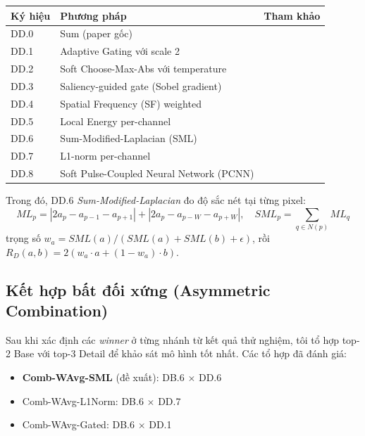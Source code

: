 \documentclass[12pt,a4paper]{article}
\begin{document}
\begin{table}[h]
\centering
\small
\begin{tabular}{lll}
\toprule
\textbf{Ký hiệu} & \textbf{Phương pháp} & \textbf{Tham khảo} \\
\midrule
DD.0 & Sum (paper gốc) & \cite{zhao2023cddfuse} \\
DD.1 & Adaptive Gating với scale 2 & \cite{prabhakar2017deepfuse} \\
DD.2 & Soft Choose-Max-Abs với temperature & \cite{li1995wavelet} \\
DD.3 & Saliency-guided gate (Sobel gradient) & \cite{liu2016saliency} \\
DD.4 & Spatial Frequency (SF) weighted & \cite{eskicioglu1995sf} \\
DD.5 & Local Energy per-channel & \cite{liu2018survey} \\
DD.6 & Sum-Modified-Laplacian (SML) & \cite{huang2007sml} \\
DD.7 & L1-norm per-channel & \cite{li2018densefuse} \\
DD.8 & Soft Pulse-Coupled Neural Network (PCNN) & \cite{eckhorn1990pcnn, yin2019papcnn} \\
\bottomrule
\end{tabular}
\end{table}

Trong đó, DD.6 \emph{Sum-Modified-Laplacian} đo độ sắc nét tại từng pixel:
\begin{equation}
ML_p = |2a_p - a_{p-1} - a_{p+1}| + |2a_p - a_{p-W} - a_{p+W}|, \quad SML_p = \sum_{q \in N(p)} ML_q
\end{equation}
trọng số $w_a = SML(a) / (SML(a) + SML(b) + \epsilon)$, rồi $R_D(a, b) = 2(w_a \cdot a + (1 - w_a) \cdot b)$.

\subsection{Kết hợp bất đối xứng (Asymmetric Combination)}

Sau khi xác định các \emph{winner} ở từng nhánh từ kết quả thử nghiệm, tôi tổ hợp top-2 Base với top-3 Detail để khảo sát mô hình tốt nhất. Các tổ hợp đã đánh giá:
\begin{itemize}\itemsep0pt
    \item \textbf{Comb-WAvg-SML} (đề xuất): DB.6 $\times$ DD.6
    \item Comb-WAvg-L1Norm: DB.6 $\times$ DD.7
    \item Comb-WAvg-Gated: DB.6 $\times$ DD.1
\end{itemize}
\end{document}
